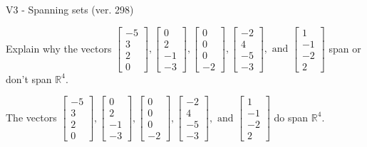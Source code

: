 \begin{exercise}
  \begin{exerciseTitle}V3 - Spanning sets (ver. 298)\end{exerciseTitle}
  \begin{exerciseStatement}
    Explain why the vectors \(\left[\begin{array}{r}
-5 \\
3 \\
2 \\
0
\end{array}\right] , \left[\begin{array}{r}
0 \\
2 \\
-1 \\
-3
\end{array}\right] , \left[\begin{array}{r}
0 \\
0 \\
0 \\
-2
\end{array}\right] , \left[\begin{array}{r}
-2 \\
4 \\
-5 \\
-3
\end{array}\right] , \text{ and } \left[\begin{array}{r}
1 \\
-1 \\
-2 \\
2
\end{array}\right]\) span or don't span \(\mathbb{R}^4\). 
	


  \end{exerciseStatement}
  \begin{exerciseAnswer}
   The vectors \(\left[\begin{array}{r}
-5 \\
3 \\
2 \\
0
\end{array}\right] , \left[\begin{array}{r}
0 \\
2 \\
-1 \\
-3
\end{array}\right] , \left[\begin{array}{r}
0 \\
0 \\
0 \\
-2
\end{array}\right] , \left[\begin{array}{r}
-2 \\
4 \\
-5 \\
-3
\end{array}\right] , \text{ and } \left[\begin{array}{r}
1 \\
-1 \\
-2 \\
2
\end{array}\right]\) 
  	 do  
	span \(\mathbb{R}^4\).
  



\end{exerciseAnswer}
\end{exercise}
